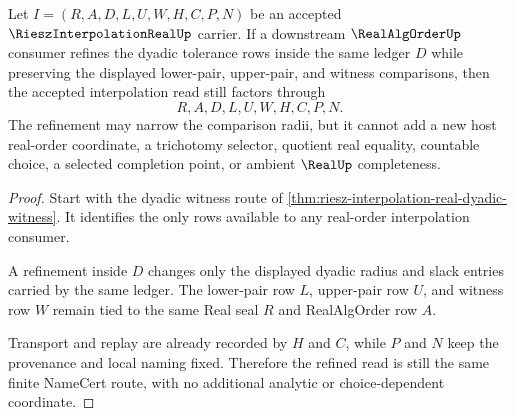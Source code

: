 \begin{theorem}
\label{thm:riesz-interpolation-real-ledger-stability}
Let $I=(R,A,D,L,U,W,H,C,P,N)$ be an accepted $\RieszInterpolationRealUp$ carrier. If a downstream $\RealAlgOrderUp$ consumer refines the dyadic tolerance rows inside the same ledger $D$ while preserving the displayed lower-pair, upper-pair, and witness comparisons, then the accepted interpolation read still factors through
$$
R,A,D,L,U,W,H,C,P,N .
$$
The refinement may narrow the comparison radii, but it cannot add a new host real-order coordinate, a trichotomy selector, quotient real equality, countable choice, a selected completion point, or ambient $\RealUp$ completeness.
\end{theorem}
\begin{proof}
Start with the dyadic witness route of \autoref{thm:riesz-interpolation-real-dyadic-witness}. It identifies the only rows available to any real-order interpolation consumer.

A refinement inside $D$ changes only the displayed dyadic radius and slack entries carried by the same ledger. The lower-pair row $L$, upper-pair row $U$, and witness row $W$ remain tied to the same Real seal $R$ and RealAlgOrder row $A$.

Transport and replay are already recorded by $H$ and $C$, while $P$ and $N$ keep the provenance and local naming fixed. Therefore the refined read is still the same finite NameCert route, with no additional analytic or choice-dependent coordinate.
\end{proof}




